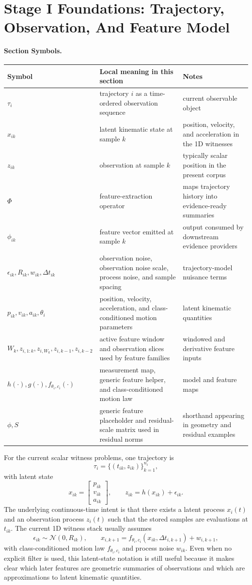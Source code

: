 \documentclass[11pt]{article}
\newcommand{\sectionsymbol}[3]{#1 & #2 & #3 \\}
\newcommand{\sectionsymbols}[1]{%
\begin{center}
\small
\setlength{\tabcolsep}{4pt}
\begin{tabularx}{0.95\textwidth}{>{\raggedright\arraybackslash}p{0.16\textwidth}X>{\raggedright\arraybackslash}p{0.18\textwidth}}
\toprule
Symbol & Local meaning in this section & Notes \\
\midrule
#1
\bottomrule
\end{tabularx}
\end{center}
}
\begin{document}
\section{Stage I Foundations: Trajectory, Observation, And Feature Model}
\paragraph{Section Symbols.}
\sectionsymbols{
\sectionsymbol{\(\tau_i\)}{trajectory \(i\) as a time-ordered observation sequence}{current observable object}
\sectionsymbol{\(x_{ik}\)}{latent kinematic state at sample \(k\)}{position, velocity, and acceleration in the 1D witnesses}
\sectionsymbol{\(z_{ik}\)}{observation at sample \(k\)}{typically scalar position in the present corpus}
\sectionsymbol{\(\Phi\)}{feature-extraction operator}{maps trajectory history into evidence-ready summaries}
\sectionsymbol{\(\phi_{ik}\)}{feature vector emitted at sample \(k\)}{output consumed by downstream evidence providers}
\sectionsymbol{\(\epsilon_{ik}, R_{ik}, w_{ik}, \Delta t_{ik}\)}{observation noise, observation noise scale, process noise, and sample spacing}{trajectory-model nuisance terms}
\sectionsymbol{\(p_{ik}, v_{ik}, a_{ik}, \theta_i\)}{position, velocity, acceleration, and class-conditioned motion parameters}{latent kinematic quantities}
\sectionsymbol{\(W_k, z_{i,1:k}, z_{i,W_k}, z_{i,k-1}, z_{i,k-2}\)}{active feature window and observation slices used by feature families}{windowed and derivative feature inputs}
\sectionsymbol{\(h(\cdot), g(\cdot), f_{\theta_i,c_i}(\cdot)\)}{measurement map, generic feature helper, and class-conditioned motion law}{model and feature maps}
\sectionsymbol{\(\phi, S\)}{generic feature placeholder and residual-scale matrix used in residual norms}{shorthand appearing in geometry and residual examples}
}

\noindent
For the current scalar witness problems, one trajectory is
\begin{equation}
\tau_i = \{(t_{ik}, z_{ik})\}_{k=1}^{n_i},
\end{equation}
with latent state
\begin{equation}
x_{ik} =
\begin{bmatrix}
p_{ik} \\
v_{ik} \\
a_{ik}
\end{bmatrix},
\qquad
z_{ik} = h(x_{ik}) + \epsilon_{ik}.
\end{equation}
The underlying continuous-time intent is that there exists a latent process
\(x_i(t)\) and an observation process \(z_i(t)\) such that the stored samples
are evaluations at \(t_{ik}\). The current 1D witness stack usually assumes
\begin{equation}
\epsilon_{ik} \sim \mathcal{N}(0, R_{ik}),
\qquad
x_{i,k+1} = f_{\theta_i,c_i}(x_{ik}, \Delta t_{i,k+1}) + w_{i,k+1},
\end{equation}
with class-conditioned motion law \(f_{\theta_i,c_i}\) and process noise
\(w_{ik}\). Even when no explicit filter is used, this latent-state notation is
still useful because it makes clear which later features are geometric summaries
of observations and which are approximations to latent kinematic quantities.
\end{document}
